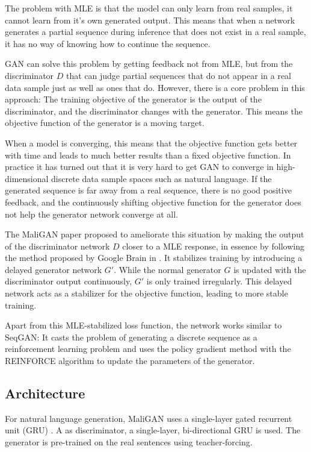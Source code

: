 \documentclass[a4paper,conference]{IEEEtran}
\begin{document}
The problem with MLE is that the model can only learn from real samples, it cannot learn from it's own generated output. This means that when a network generates a partial sequence during inference that does not exist in a real sample, it has no way of knowing how to continue the sequence.

GAN can solve this problem by getting feedback not from MLE, but from the discriminator $D$ that can judge partial sequences that do not appear in a real data sample just as well as ones that do. However, there is a core problem in this approach: The training objective of the generator is the output of the discriminator, and the discriminator changes with the generator. This means the objective function of the generator is a moving target.

When a model is converging, this means that the objective function gets better with time and leads to much better results than a fixed objective function. In practice it has turned out that it is very hard to get GAN to converge in high-dimensional discrete data sample spaces such as natural language. If the generated sequence is far away from a real sequence, there is no good positive feedback, and the continuously shifting objective function for the generator does not help the generator network converge at all.

The MaliGAN paper proposed to ameliorate this situation by making the output of the discriminator network $D$ closer to a MLE response, in essence by following the method proposed by Google Brain in \cite{c24}. It stabilizes training by introducing a delayed generator network $G'$. While the normal generator $G$ is updated with the discriminator output continuously, $G'$ is only trained irregularly. This delayed network acts as a stabilizer for the objective function, leading to more stable training.

Apart from this MLE-stabilized loss function, the network works similar to SeqGAN: It casts the problem of generating a discrete sequence as a reinforcement learning problem and uses the policy gradient method with the REINFORCE algorithm to update the parameters of the generator.

\subsection{Architecture}
For natural language generation, MaliGAN uses a single-layer gated recurrent unit (GRU) \cite{c26}.  A as discriminator, a single-layer, bi-directional GRU is used. The generator is pre-trained on the real sentences using teacher-forcing. 
\end{document}
